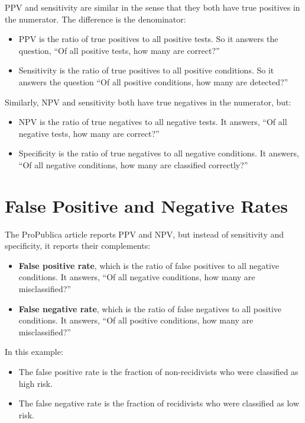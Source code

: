 PPV and sensitivity are similar in the sense that they both have true
positives in the numerator. The difference is the denominator:

\begin{itemize}
\item
  PPV is the ratio of true positives to all positive tests. So it
  answers the question, ``Of all positive tests, how many are correct?''
\item
  Sensitivity is the ratio of true positives to all positive conditions.
  So it answers the question ``Of all positive conditions, how many are
  detected?''
\end{itemize}

Similarly, NPV and sensitivity both have true negatives in the
numerator, but:

\begin{itemize}
\item
  NPV is the ratio of true negatives to all negative tests. It answers,
  ``Of all negative tests, how many are correct?''
\item
  Specificity is the ratio of true negatives to all negative conditions.
  It answers, ``Of all negative conditions, how many are classified
  correctly?''
\end{itemize}

\hypertarget{false-positive-and-negative-rates}{%
\section{False Positive and Negative
Rates}\label{false-positive-and-negative-rates}}

The ProPublica article reports PPV and NPV, but instead of sensitivity
and specificity, it reports their complements:

\begin{itemize}
\item
  \textbf{False positive rate}, which is the ratio of false positives to
  all negative conditions. It answers, ``Of all negative conditions, how
  many are misclassified?''
\item
  \textbf{False negative rate}, which is the ratio of false negatives to
  all positive conditions. It answers, ``Of all positive conditions, how
  many are misclassified?''
\end{itemize}

In this example:

\begin{itemize}
\item
  The false positive rate is the fraction of non-recidivists who were
  classified as high risk.
\item
  The false negative rate is the fraction of recidivists who were
  classified as low risk.
\end{itemize}

